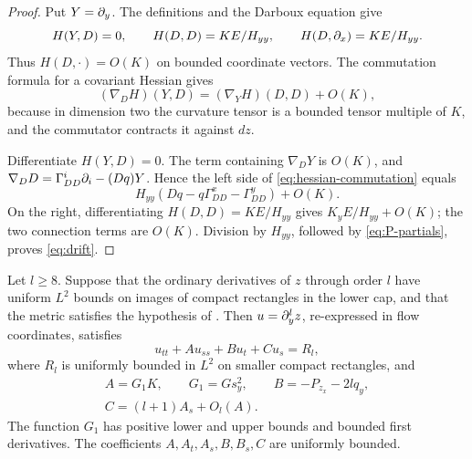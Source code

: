 \begin{proof}
Put \(Y=\partial_y\). The definitions and the Darboux equation give
\[
H(Y,D)=0,\qquad H(D,D)=KE/H_{yy},
\qquad H(D,\partial_x)=KE/H_{yy}.
\]
Thus \(H(D,\cdot)=O(K)\) on bounded coordinate vectors.
The commutation formula for a covariant Hessian gives
\begin{equation}\label{eq:hessian-commutation}
(\nabla_DH)(Y,D)=(\nabla_YH)(D,D)+O(K),
\end{equation}
because in dimension two the curvature tensor is a bounded tensor
multiple of \(K\), and the commutator contracts it against \(dz\).

Differentiate \(H(Y,D)=0\). The term containing \(\nabla_DY\)
is \(O(K)\), and
\(\nabla_DD=\Gamma^i_{DD}\partial_i-(Dq)Y\). Hence the left side
of \eqref{eq:hessian-commutation} equals
\[
H_{yy}(Dq-q\Gamma^x_{DD}-\Gamma^y_{DD})+O(K).
\]
On the right, differentiating \(H(D,D)=KE/H_{yy}\) gives
\(K_yE/H_{yy}+O(K)\); the two connection terms are \(O(K)\).
Division by \(H_{yy}\), followed by \eqref{eq:P-partials},
proves \eqref{eq:drift}.
\end{proof}

\begin{lemma}\label{lem:high-equation}
Let \(l\ge8\). Suppose that the ordinary derivatives of \(z\) through
order \(l\) have uniform \(L^2\) bounds on images of compact rectangles
in the lower cap, and that the metric satisfies the hypothesis of
. Then \(u=\partial_y^l z\), re-expressed in flow coordinates,
satisfies
\begin{equation}\label{eq:linear-cap}
u_{tt}+Au_{ss}+Bu_t+Cu_s=R_l,
\end{equation}
where \(R_l\) is uniformly bounded in \(L^2\) on smaller compact
rectangles, and
\begin{equation}\label{eq:linear-coefficients}
\begin{gathered}
A=G_1K,\qquad G_1=Gs_y^2,\qquad
B=-P_{z_x}-2lq_y,\\
C=(l+1)A_s+O_l(A).
\end{gathered}
\end{equation}
The function \(G_1\) has positive lower and upper bounds and bounded
first derivatives. The coefficients \(A,A_t,A_s,B,B_s,C\) are
uniformly bounded.
\end{lemma}

